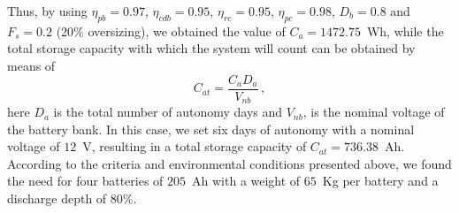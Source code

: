 \documentclass[letterpaper,11pt]{article}
\begin{document}
Thus, by using $\eta_{pb}=0.97$, $\eta_{cdb}=0.95$, $\eta_{rc}=0.95$, $\eta_{pc}=0.98$, $D_{b}=0.8$ and $F_s=0.2$ (20\% oversizing), we obtained the value of $C_a=1472.75$~Wh, while the total storage capacity with which the system will count can be obtained by means of
\begin{equation}
C_{at}=\frac{C_aD_a}{V_{nb}} \, ,
\end{equation}
here $D_a$ is the total number of autonomy days and $V_{nb}$, is the nominal voltage of the battery bank. In this case, we set six days of autonomy with a nominal voltage of $12$~V, resulting in a total storage capacity of $C_{at}=736.38$~Ah. According to the criteria and environmental conditions presented above, we found the need for four batteries of $205$~Ah with a weight of $65$~Kg per battery and a discharge depth of $80\%$.
\end{document}
